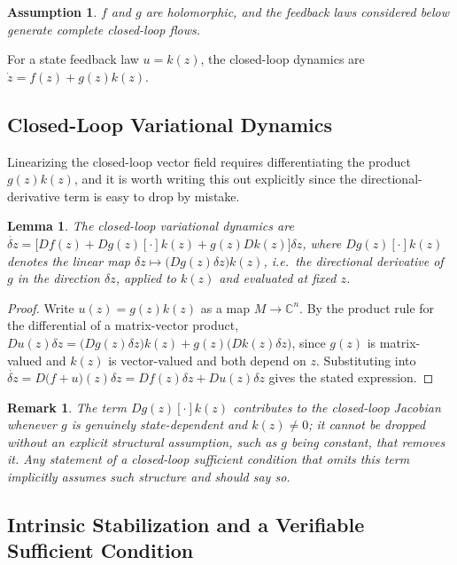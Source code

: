 \documentclass[preprint,12pt,authoryear]{elsarticle}
\newtheorem{lemma}{Lemma} %
\newtheorem{remark}{Remark}
\newtheorem{assumption}{Assumption}
\newtheorem{proof}{Proof}
\begin{document}
\begin{assumption}
\label{ass:controlcomplete}
$f$ and $g$ are holomorphic, and the feedback laws considered below generate complete closed-loop flows.
\end{assumption}

For a state feedback law $u=k(z)$, the closed-loop dynamics are $\dot z=f(z)+g(z)k(z)$.

\subsection{Closed-Loop Variational Dynamics}

Linearizing the closed-loop vector field requires differentiating the product $g(z)k(z)$, and it is worth writing this out explicitly since the directional-derivative term is easy to drop by mistake.

\begin{lemma}
\label{lem:closedloopjac}
The closed-loop variational dynamics are $\dot{\delta z}=\big[Df(z)+Dg(z)[\cdot]k(z)+g(z)Dk(z)\big]\delta z$, where $Dg(z)[\cdot]k(z)$ denotes the linear map $\delta z\mapsto \big(Dg(z)\delta z\big)k(z)$, i.e.\ the directional derivative of $g$ in the direction $\delta z$, applied to $k(z)$ and evaluated at fixed $z$.
\end{lemma}

\begin{proof}
Write $u(z)=g(z)k(z)$ as a map $M\to\mathbb{C}^n$. By the product rule for the differential of a matrix-vector product, $Du(z)\delta z=\big(Dg(z)\delta z\big)k(z)+g(z)\big(Dk(z)\delta z\big)$, since $g(z)$ is matrix-valued and $k(z)$ is vector-valued and both depend on $z$. Substituting into $\dot{\delta z}=D\big(f+u\big)(z)\delta z=Df(z)\delta z+Du(z)\delta z$ gives the stated expression.
\end{proof}

\begin{remark}
The term $Dg(z)[\cdot]k(z)$ contributes to the closed-loop Jacobian whenever $g$ is genuinely state-dependent and $k(z)\ne0$; it cannot be dropped without an explicit structural assumption, such as $g$ being constant, that removes it. Any statement of a closed-loop sufficient condition that omits this term implicitly assumes such structure and should say so.
\end{remark}

\subsection{Intrinsic Stabilization and a Verifiable Sufficient Condition}
\end{document}
